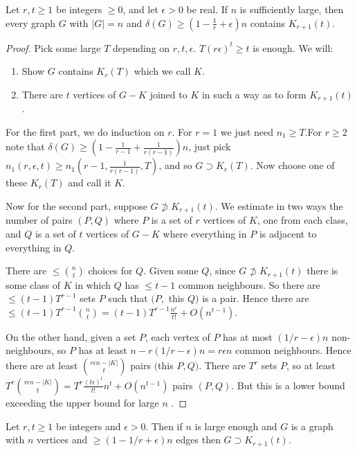 \documentclass[10pt,a4paper]{article}
\begin{document}
\begin{lemma}
Let $r,t \geq 1$ be integers $\geq 0$, and let $\epsilon >0$ be real. If $n$ is sufficiently large, then every graph $G$ with $|G|=n$ and $\delta(G) \geq (1-\frac{1}{r}+\epsilon)n$ contains $K_{r+1}(t)$.
\end{lemma}
\begin{proof}
Pick some large $T$ depending on $r, t, \epsilon$. $T(r\epsilon)^t \geq t$ is enough. We will:
\begin{enumerate}
\item Show $G$ contains $K_r(T)$ which we call $K$.
\item There are $t$ vertices of $G-K$ joined to $K$ in such a way as to form $K_{r+1}(t)$.
\end{enumerate}
For the first part, we do induction on $r$. For $r=1$ we just need $n_1 \geq T$.For $r\geq 2$ note that $\delta(G) \geq \left(1-\frac{1}{r-1}+\frac{1}{r(r-1)}\right)n$, just pick $n_1(r,\epsilon,t) \geq n_1(r-1, \frac{1}{r(r-1)}, T)$, and so $G \supset K_r(T)$. Now choose one of these $K_r(T)$ and call it $K$.

Now for the second part, suppose $G\not\supset K_{r+1}(t)$. We estimate in two ways the number of pairs $(P,Q)$ where $P$ is a set of $r$ vertices of $K$, one from each class, and $Q$ is a set of $t$ vertices of $G-K$ where everything in $P$ is adjacent to everything in $Q$.

There are $\leq \binom{n}{t}$ choices for $Q$. Given some $Q$, since $G\not\supset K_{r+1}(t)$ there is some class of $K$ in which $Q$ has $\leq t-1$ common neighbours. So there are $\leq (t-1)T^{r-1}$ sets $P$ such that $(P,$ this $Q)$ is a pair. Hence there are $\leq (t-1)T^{r-1}\binom{n}{t} = (t-1)T^{r-1}\frac{n^r}{t!} + O(n^{t-1})$.

On the other hand, given a set $P$, each vertex of $P$ has at most $(1/r - \epsilon)n$ non-neighbours, so $P$ has at least $n-r(1/r - \epsilon)n = r\epsilon n$ common neighbours. Hence there are at least $\binom{r\epsilon n - |K|}{t}$ pairs $($this $P,Q)$. There are $T^r$ sets $P$, so at least $T^r \binom{r\epsilon n - |K|}{t} = T^r \frac{(t\epsilon)^t}{t!}n^t + O(n^{t-1})$ pairs $(P,Q)$. But this is a lower bound exceeding the upper bound for large $n$ \contr.
\end{proof}
\begin{theorem}
Let $r,t \geq 1$ be integers and $\epsilon > 0$. Then if $n$ is large enough and $G$ is a graph with $n$ vertices and $\geq (1-1/r + \epsilon)n$ edges then $G \supset K_{r+1}(t)$.
\end{theorem}
\end{document}
